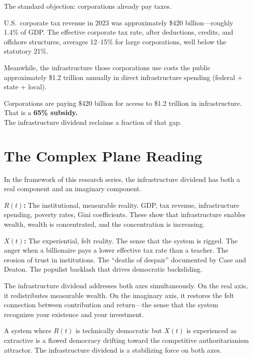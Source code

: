 \documentclass[11pt,letterpaper]{article}
\begin{document}
The standard objection: corporations already pay taxes.

U.S.\ corporate tax revenue in 2023 was approximately \$420 billion---roughly 1.4\% of GDP. The effective corporate tax rate, after deductions, credits, and offshore structures, averages 12--15\% for large corporations, well below the statutory 21\%.

Meanwhile, the infrastructure those corporations use costs the public approximately \$1.2 trillion annually in direct infrastructure spending (federal + state + local).

\begin{center}
\colorbox{psclight}{\parbox{0.85\textwidth}{\centering Corporations are paying \$420 billion for access to \$1.2 trillion in infrastructure.\\That is a \textbf{65\% subsidy.}\\The infrastructure dividend reclaims a fraction of that gap.}}
\end{center}

\section{The Complex Plane Reading}

In the framework of this research series, the infrastructure dividend has both a real component and an imaginary component.

\textbf{\(R(t)\):} The institutional, measurable reality. GDP, tax revenue, infrastructure spending, poverty rates, Gini coefficients. These show that infrastructure enables wealth, wealth is concentrated, and the concentration is increasing.

\textbf{\(X(t)\):} The experiential, felt reality. The sense that the system is rigged. The anger when a billionaire pays a lower effective tax rate than a teacher. The erosion of trust in institutions. The ``deaths of despair'' documented by Case and Deaton. The populist backlash that drives democratic backsliding.

The infrastructure dividend addresses both axes simultaneously. On the real axis, it redistributes measurable wealth. On the imaginary axis, it restores the felt connection between contribution and return---the sense that the system recognizes your existence and your investment.

A system where \(R(t)\) is technically democratic but \(X(t)\) is experienced as extractive is a flawed democracy drifting toward the competitive authoritarianism attractor. The infrastructure dividend is a stabilizing force on both axes.
\end{document}
